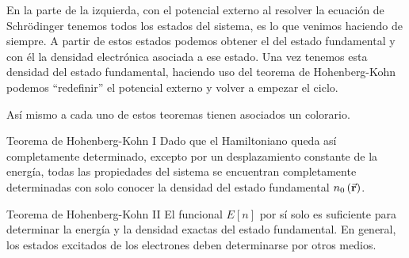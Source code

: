 En la parte de la izquierda, con el potencial externo al resolver la ecuación de Schrödinger tenemos todos los estados del sistema, es lo que venimos haciendo de siempre. A partir de estos estados podemos obtener el del estado fundamental y con él la densidad electrónica asociada a ese estado. Una vez tenemos esta densidad del estado fundamental, haciendo uso del teorema de Hohenberg-Kohn podemos ``redefinir'' el potencial externo y volver a empezar el ciclo.

Así mismo a cada uno de estos teoremas tienen asociados un colorario.

\begin{mycoro}{Teorema de Hohenberg-Kohn I}{}
    Dado que el Hamiltoniano queda así completamente determinado, excepto por un desplazamiento constante de la energía, todas las propiedades del sistema se encuentran completamente determinadas con solo conocer la densidad del estado fundamental $n_0 \left( \va{r} \right)$.
\end{mycoro}

\begin{mycoro}{Teorema de Hohenberg-Kohn II}{}
    El funcional $E \left[ n \right]$ por sí solo es suficiente para determinar la energía y la densidad exactas del estado fundamental. En general, los estados excitados de los electrones deben determinarse por otros medios.
\end{mycoro}